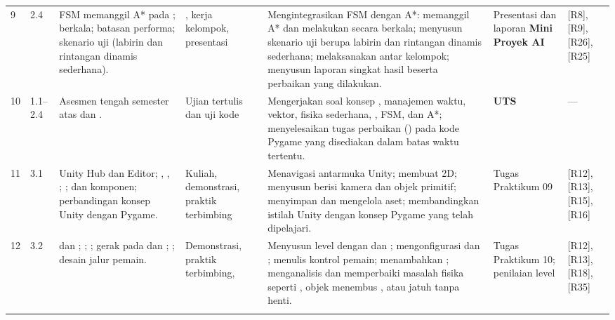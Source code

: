 \begin{landscape}
{\begin{longtable}{@{}L{1.0cm} L{2.0cm} L{4.2cm} L{3.0cm} L{7.8cm} L{3.4cm} L{2.0cm}@{}}
9 & 2.4 &
FSM memanggil A* pada ;  berkala; batasan performa; skenario uji (labirin dan rintangan dinamis sederhana). &
, kerja kelompok, presentasi &
Mengintegrasikan FSM dengan A*:  memanggil A* dan melakukan  secara berkala; menyusun skenario uji berupa labirin dan rintangan dinamis sederhana; melaksanakan  antar kelompok; menyusun laporan singkat hasil  beserta perbaikan yang dilakukan. &
Presentasi dan laporan \textbf{Mini Proyek AI} & [R8], [R9], [R26], [R25] \\
\addlinespace

10 & 1.1--2.4 &
Asesmen tengah semester atas  dan . &
Ujian tertulis dan uji kode &
Mengerjakan soal konsep , manajemen waktu, vektor, fisika sederhana, , FSM, dan A*; menyelesaikan tugas perbaikan  () pada kode Pygame yang disediakan dalam batas waktu tertentu. &
\textbf{UTS} & --- \\
\addlinespace

11 & 3.1 &
Unity Hub dan Editor; , , ; ;  dan komponen; perbandingan konsep Unity dengan Pygame. &
Kuliah, demonstrasi, praktik terbimbing &
Menavigasi antarmuka Unity; membuat  2D; menyusun  berisi kamera dan objek primitif; menyimpan  dan mengelola aset; membandingkan istilah Unity dengan konsep Pygame yang telah dipelajari. &
Tugas Praktikum 09 & [R12], [R13], [R15], [R16] \\
\addlinespace

12 & 3.2 &
 dan ; ; ;  gerak pada  dan ; ; desain jalur pemain. &
Demonstrasi, praktik terbimbing,  &
Menyusun level dengan  dan ; mengonfigurasi  dan ; menulis  kontrol pemain; menambahkan ; menganalisis dan memperbaiki masalah fisika seperti , objek menembus , atau jatuh tanpa henti. &
Tugas Praktikum 10; penilaian level & [R12], [R13], [R18], [R35] \\
\addlinespace


\end{longtable}}
\end{landscape}
